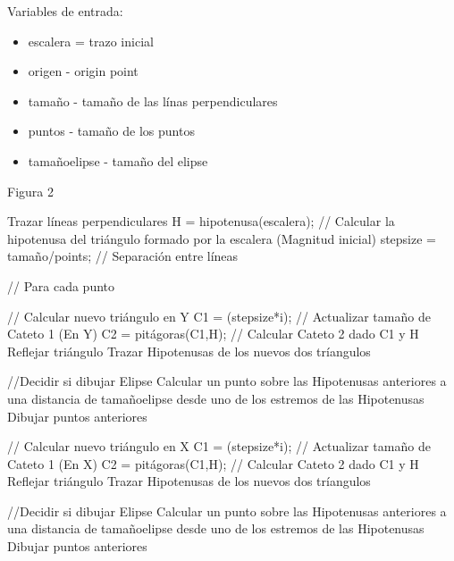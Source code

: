\documentclass[letter,10pt]{article}
\begin{document}
 

Variables de entrada:
\begin{itemize}
	\item  escalera = trazo inicial
	\item  origen - origin point
	\item  tamaño - tamaño de las línas perpendiculares
	\item  puntos - tamaño de los puntos
	\item tamañoelipse - tamaño del elipse
\end{itemize}

\begin{algorithm}
	\caption{Figura 2} 
	\begin{algorithmic}[1]

		\State Trazar líneas perpendiculares
		\State H = hipotenusa(escalera); // Calcular la hipotenusa del triángulo formado por la escalera (Magnitud inicial)
		\State stepsize = tamaño/points; // Separación entre líneas

		 // Para cada punto

			\State // Calcular nuevo triángulo en Y
			\State  C1 = (stepsize*i);   // Actualizar tamaño de Cateto 1 (En Y)
			\State  C2 = pitágoras(C1,H); // Calcular Cateto 2 dado C1 y H
			\State  Reflejar triángulo
			\State 	Trazar Hipotenusas de los nuevos dos tríangulos
			
			 //Decidir si dibujar Elipse
				\State Calcular un punto sobre las Hipotenusas anteriores a una distancia de tamañoelipse desde uno de los estremos de las Hipotenusas
				\State Dibujar puntos anteriores
			\EndIf

			\State // Calcular nuevo triángulo en X
			\State  C1 = (stepsize*i);   // Actualizar tamaño de Cateto 1 (En X)
			\State  C2 = pitágoras(C1,H); // Calcular Cateto 2 dado C1 y H
			\State  Reflejar triángulo
			\State 	Trazar Hipotenusas de los nuevos dos tríangulos
			
			 //Decidir si dibujar Elipse
				\State Calcular un punto sobre las Hipotenusas anteriores a una distancia de tamañoelipse desde uno de los estremos de las Hipotenusas
				\State Dibujar puntos anteriores
			\EndIf
		\EndFor
	\end{algorithmic} 
\end{algorithm}
\end{document}
